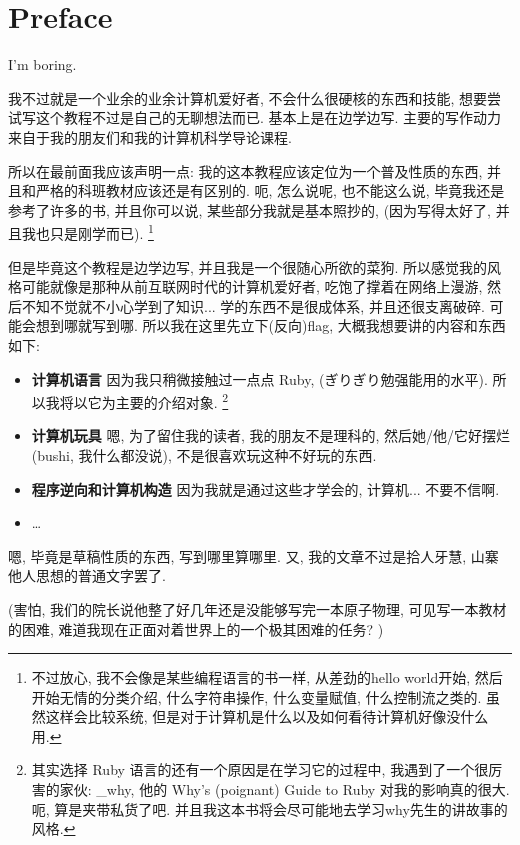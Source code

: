 \chapter{Preface}

\centerline{I'm boring. }

我不过就是一个业余的业余计算机爱好者, 不会什么很硬核的东西和技能, 想要尝试写这个教程不过是自己的无聊想法而已. 基本上是在边学边写. 主要的写作动力来自于我的朋友们和我的计算机科学导论课程. 

所以在最前面我应该声明一点: 我的这本教程应该定位为一个普及性质的东西, 并且和严格的科班教材应该还是有区别的. 呃, 怎么说呢, 也不能这么说, 
毕竟我还是参考了许多的书, 并且你可以说, 某些部分我就是基本照抄的, (因为写得太好了, 并且我也只是刚学而已). \footnote{不过放心, 我不会像是某些编程语言的书一样, 从差劲的hello world开始, 然后开始无情的分类介绍, 什么字符串操作, 什么变量赋值, 什么控制流之类的. 虽然这样会比较系统, 但是对于计算机是什么以及如何看待计算机好像没什么用. }

但是毕竟这个教程是边学边写, 并且我是一个很随心所欲的菜狗. 所以感觉我的风格可能就像是那种从前互联网时代的计算机爱好者, 吃饱了撑着在网络上漫游, 然后不知不觉就不小心学到了知识... 学的东西不是很成体系, 并且还很支离破碎. 可能会想到哪就写到哪. 所以我在这里先立下(反向)flag, 大概我想要讲的内容和东西如下: 

\begin{itemize}
  \item \textbf{计算机语言} 因为我只稍微接触过一点点 Ruby, 
  (ぎりぎり勉强能用的水平). 所以我将以它为主要的介绍对象. 
  \footnote{其实选择 Ruby 语言的还有一个原因是在学习它的过程中, 我遇到了一个很厉害的家伙: \_why, 他的 Why's (poignant) Guide to Ruby 对我的影响真的很大. 呃, 算是夹带私货了吧. 并且我这本书将会尽可能地去学习why先生的讲故事的风格. }
  \item \textbf{计算机玩具} 嗯, 为了留住我的读者, 
  我的朋友不是理科的, 然后她/他/它好摆烂(bushi, 我什么都没说), 
  不是很喜欢玩这种不好玩的东西. 
  \item \textbf{程序逆向和计算机构造} 因为我就是通过这些才学会的,
  计算机... 不要不信啊. 
  \item \dots
\end{itemize}

嗯, 毕竟是草稿性质的东西, 写到哪里算哪里. 又, 我的文章不过是拾人牙慧, 山寨他人思想的普通文字罢了. 

(害怕, 我们的院长说他整了好几年还是没能够写完一本原子物理, 可见写一本教材的困难, 难道我现在正面对着世界上的一个极其困难的任务? )

% 
% 
% 
% 

